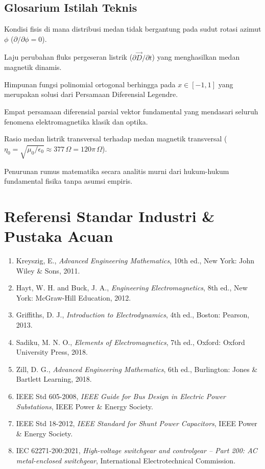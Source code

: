 \documentclass[11pt,a4paper]{article}
\theoremstyle{definition}
\begin{document}
\subsection{Glosarium Istilah Teknis}
\begin{description}[leftmargin=!,labelwidth=4.5cm]
    \item[Azimuthal Symmetry] Kondisi fisis di mana distribusi medan tidak bergantung pada sudut rotasi azimut $\phi$ ($\partial/\partial\phi = 0$).
    \item[Displacement Current] Laju perubahan fluks pergeseran listrik ($\partial\vec{D}/\partial t$) yang menghasilkan medan magnetik dinamis.
    \item[Legendre Polynomials] Himpunan fungsi polinomial ortogonal berhingga pada $x \in [-1, 1]$ yang merupakan solusi dari Persamaan Diferensial Legendre.
    \item[Maxwell's Equations] Empat persamaan diferensial parsial vektor fundamental yang mendasari seluruh fenomena elektromagnetika klasik dan optika.
    \item[Wave Impedance ($\eta_0$)] Rasio medan listrik transversal terhadap medan magnetik transversal ($\eta_0 = \sqrt{\mu_0/\epsilon_0} \approx 377\,\Omega = 120\pi\,\Omega$).
    \item[First-Principles Derivation] Penurunan rumus matematika secara analitis murni dari hukum-hukum fundamental fisika tanpa asumsi empiris.
\end{description}

\section{Referensi Standar Industri \& Pustaka Acuan}
\begin{enumerate}[leftmargin=*]
    \item Kreyszig, E., \textit{Advanced Engineering Mathematics}, 10th ed., New York: John Wiley \& Sons, 2011.
    \item Hayt, W. H. and Buck, J. A., \textit{Engineering Electromagnetics}, 8th ed., New York: McGraw-Hill Education, 2012.
    \item Griffiths, D. J., \textit{Introduction to Electrodynamics}, 4th ed., Boston: Pearson, 2013.
    \item Sadiku, M. N. O., \textit{Elements of Electromagnetics}, 7th ed., Oxford: Oxford University Press, 2018.
    \item Zill, D. G., \textit{Advanced Engineering Mathematics}, 6th ed., Burlington: Jones \& Bartlett Learning, 2018.
    \item IEEE Std 605-2008, \textit{IEEE Guide for Bus Design in Electric Power Substations}, IEEE Power \& Energy Society.
    \item IEEE Std 18-2012, \textit{IEEE Standard for Shunt Power Capacitors}, IEEE Power \& Energy Society.
    \item IEC 62271-200:2021, \textit{High-voltage switchgear and controlgear -- Part 200: AC metal-enclosed switchgear}, International Electrotechnical Commission.
\end{enumerate}
\end{document}
